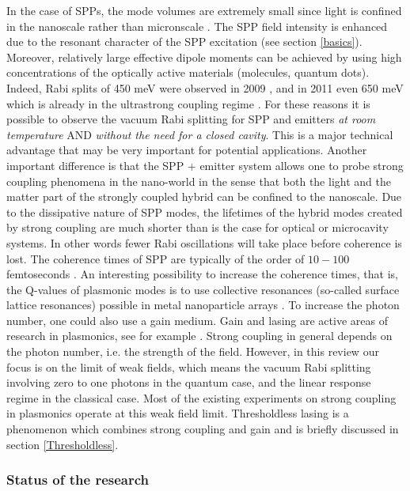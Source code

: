 \documentclass[12pt]{iopart}
\begin{document}
In the case of SPPs, the mode volumes are extremely small since light is confined in the nanoscale rather than micronscale \cite{Gramotnev_NatPhot_2010_4_83}. The SPP field intensity is enhanced due to the resonant character of the SPP excitation (see section \ref{basics}). Moreover, relatively large effective dipole moments can be achieved by using high concentrations of the optically active materials (molecules, quantum dots). Indeed, Rabi splits of 450 meV were observed in 2009 \cite{Bellessa2009}, and in 2011 even 650 meV which is already in the ultrastrong coupling regime \cite{Schwartz2011}. For these reasons it is possible to observe the vacuum Rabi splitting for SPP and emitters {\it at room temperature} AND {\it without the need for a closed cavity}. This is a major technical advantage that may be very important for potential applications. Another important difference is that the SPP + emitter system allows one to probe strong coupling phenomena in the nano-world in the sense that both the light and the matter part of the strongly coupled hybrid can be confined to the nanoscale. Due to the dissipative nature of SPP modes, the lifetimes of the hybrid modes created by strong coupling are much shorter than is the case for optical or microcavity systems. In other words fewer Rabi oscillations will take place before coherence is lost. The coherence times of SPP are typically of the order of $10-100$ femtoseconds \cite{van_Exter_PRL_1988_60_49,Sonnichsen_2002_PRL_88_077402}. An interesting possibility to increase the coherence times, that is, the Q-values of plasmonic modes is to use collective resonances (so-called surface lattice resonances) possible in metal nanoparticle arrays \cite{Zou2004,Auguie2008,GarciadeAbajo2007}.
To increase the photon number, one could also use a gain medium. Gain and lasing are active areas of research in plasmonics, see for example \cite{Berini_NatPhot_2012_6_16}. Strong coupling in general depends on the photon number, i.e. the strength of the field. However, in this review our focus is on the limit of weak fields, which means the vacuum Rabi splitting involving zero to one photons in the quantum case, and the linear response regime in the classical case. Most of the existing experiments on strong coupling in plasmonics operate at this weak field limit. Thresholdless lasing is a phenomenon which combines strong coupling and gain and is briefly discussed in section \ref{Thresholdless}. 

\subsubsection{Status of the research}
\end{document}

